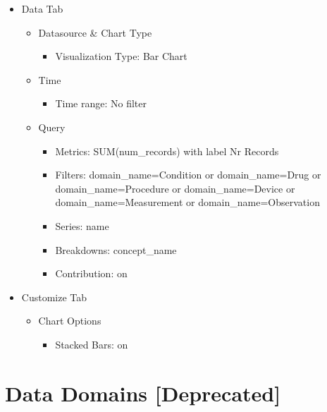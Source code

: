 \documentclass[
]{book}
\providecommand{\tightlist}{%
  \setlength{\itemsep}{0pt}\setlength{\parskip}{0pt}}
\begin{document}
\begin{itemize}
\tightlist
\item
  Data Tab

  \begin{itemize}
  \tightlist
  \item
    Datasource \& Chart Type

    \begin{itemize}
    \tightlist
    \item
      Visualization Type: Bar Chart
    \end{itemize}
  \item
    Time

    \begin{itemize}
    \tightlist
    \item
      Time range: No filter
    \end{itemize}
  \item
    Query

    \begin{itemize}
    \tightlist
    \item
      Metrics: SUM(num\_records) with label Nr Records
    \item
      Filters: domain\_name=Condition or domain\_name=Drug or domain\_name=Procedure or domain\_name=Device or domain\_name=Measurement or domain\_name=Observation
    \item
      Series: name
    \item
      Breakdowns: concept\_name
    \item
      Contribution: on
    \end{itemize}
  \end{itemize}
\item
  Customize Tab

  \begin{itemize}
  \tightlist
  \item
    Chart Options

    \begin{itemize}
    \tightlist
    \item
      Stacked Bars: on
    \end{itemize}
  \end{itemize}
\end{itemize}

\hypertarget{data-domains-deprecated}{%
\section{Data Domains {[}Deprecated{]}}\label{data-domains-deprecated}}
\end{document}
